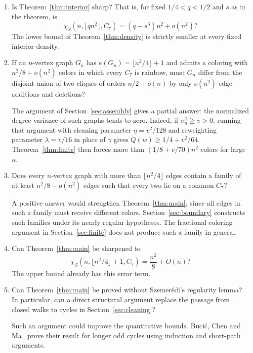 \documentclass[10pt]{article}
\theoremstyle{remark}
\begin{document}
\begin{enumerate}
\item Is Theorem~\ref{thm:interior} sharp? That is, for fixed $1/4<q<1/2$ and $s$ as in the theorem, is
\[
 \chi_S(n,\lfloor qn^2\rfloor,C_7)=(q-s^3)n^2+o(n^2)?
\]
The lower bound of Theorem~\ref{thm:density} is strictly smaller at every fixed interior density.

\item If an $n$-vertex graph $G_n$ has $e(G_n)=\lfloor n^2/4\rfloor+1$ and admits a coloring with $n^2/8+o(n^2)$ colors in which every $C_7$ is rainbow, must $G_n$ differ from the disjoint union of two cliques of orders $n/2+o(n)$ by only $o(n^2)$ edge additions and deletions?

The argument of Section~\ref{sec:assembly} gives a partial answer: the normalized degree variance of such graphs tends to zero. Indeed, if $\sigma_n^2\ge v>0$, running that argument with cleaning parameter $\eta=v^2/128$ and reweighting parameter $\lambda=v/16$ in place of $\gamma$ gives $Q(w)\ge1/4+v^2/64$. Theorem~\ref{thm:finite} then forces more than $(1/8+v/70)n^2$ colors for large $n$.

\item Does every $n$-vertex graph with more than $\lfloor n^2/4\rfloor$ edges contain a family of at least $n^2/8-o(n^2)$ edges such that every two lie on a common $C_7$?

A positive answer would strengthen Theorem~\ref{thm:main}, since all edges in such a family must receive different colors. Section~\ref{sec:boundary} constructs such families under its nearly regular hypotheses. The fractional coloring argument in Section~\ref{sec:finite} does not produce such a family in general.

\item Can Theorem~\ref{thm:main} be sharpened to
\[
 \chi_S(n,\lfloor n^2/4\rfloor+1,C_7)=\frac{n^2}{8}+O(n)?
\]
The upper bound already has this error term.

\item Can Theorem~\ref{thm:main} be proved without Szemer\'{e}di's regularity lemma? In particular, can a direct structural argument replace the passage from closed walks to cycles in Section~\ref{sec:cleaning}?

Such an argument could improve the quantitative bounds. Buci\'{c}, Chen and Ma~\cite[Sections~2--4]{BCM} prove their result for longer odd cycles using induction and short-path arguments.
\end{enumerate}
\end{document}
